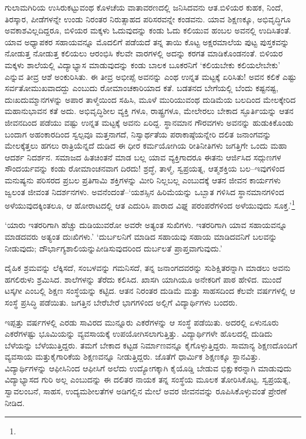 ಗುಲಾಮಗಿರಿಯ ಉಸಿರುಕಟ್ಟುವಂಥ ಕೊಳಚೆಯ ವಾತಾವರಣದಲ್ಲಿ ಜನಿಸಿದವನು ಆತ.\break ಬಿಳಿಯರ ಕುಹಕ, ನಿಂದೆ, ತಿರಸ್ಕಾರ, ಪೀಡೆಗಳನ್ನೇ ಉಂಡು ನಿರಂತರ ನಿರುತ್ಸಾಹದ ಪರಿಸರವನ್ನೇ ಕಂಡವನು. ಯಾವ ಶಿಕ್ಷಣಕ್ಕೂ, ಅಭಿವೃದ್ಧಿಗೂ ಅವಕಾಶವಿಲ್ಲದಿದ್ದರೂ, ಬಿಳಿಯರ ಮಕ್ಕಳು ಓದುವುದನ್ನು ಕಂಡು ಓದು ಕಲಿಯುವ ಹಂಬಲ ಅವನಲ್ಲಿ ಉದಿಸಿತಂತೆ. ಯಾವ ಅಧ್ಯಾಪಕರ ಸಹಾಯವನ್ನೂ ಮೊದಲಿಗೆ ಪಡೆಯದೆ ತನ್ನ ತಾಯಿ ಕೊಟ್ಟ ಅಕ್ಷರಮಾಲೆಯ ಪುಟ್ಟ ಪುಸ್ತಕವನ್ನು ನೋಡುತ್ತ ನೋಡುತ್ತ ಕಲಿಯಲು ಆರಂಭಿಸಿ ಕೆಲವೇ ವಾರಗಳಲ್ಲಿ ಅದನ್ನು ಕರಗತ ಮಾಡಿಕೊಂಡನಂತೆ. ಬಿಳಿಯರ ಮಕ್ಕಳು ಶಾಲೆಯಲ್ಲಿ ವಿದ್ಯಾಭ್ಯಾಸ ಮಾಡುವುದನ್ನು ಕಂಡು ಬಾಲಕ ಬೂಕರನಿಗೆ ‘ಕಲಿಯಬೇಕು ಕಲಿಯಲೇಬೇಕು’ ಎನ್ನುವ ತೀವ್ರ ಆಶೆ ಅಂಕುರಿಸಿತು. ಈ ತೀವ್ರ ಅಭೀಪ್ಸೆ ಅವನನ್ನು ಎಂಥ ಉನ್ನತ ಮಟ್ಟಕ್ಕೆ ಏರಿಸಿತು! ಅವನ ಕಲಿಕೆ ಎಷ್ಟು ಸರ್ವತೋಮುಖ\-ವಾದದ್ದು ಎಂಬುದು ರೋಮಾಂಚಕಾರಿಯಾದ ಕತೆ. ಬಡತನದ ಬೇಗೆಯಲ್ಲಿ ಬೆಂದು ಕಷ್ಟನಷ್ಟ, ದುಃಖ\-ದುಮ್ಮಾನಗಳನ್ನು ಅಪಾರ ತಾಳ್ಮೆಯಿಂದ ಸಹಿಸಿ, ಮೂಳೆ ಮುರಿಯುವಂಥ ದುಡಿಮೆಯ ಬಲದಿಂದ ಮೇಲಕ್ಕೇರಿದ ಮಹಾನುಭಾವನ ಕತೆ ಅದು. ಅಭಿವೃದ್ಧಿಶೀಲ ವ್ಯಕ್ತಿ ಗಳೂ, ರಾಷ್ಟ್ರಗಳೂ, ಮೇಲೇರಲು ಬೇಕಾದ ಸ್ಫೂರ್ತಿಯನ್ನು ಆತನ ಜೀವನದಿಂದ ಪಡೆಯು ವಷ್ಟು ಉನ್ನತ ಮಟ್ಟಕ್ಕೆ ಅವನು ಏರಿದ್ದ. ಸ್ಥಾನಮಾನ ಗೌರವಗಳು ಅವನನ್ನು ಹುಡುಕಿಕೊಂಡು ಬಂದಾಗ ಅಹಂಕಾರದಿಂದ ಸ್ವಲ್ಪವೂ ಮತ್ತನಾಗದೆ, ನಿಸ್ವಾರ್ಥತೆಯ ಪರಾಕಾಷ್ಠೆಯನ್ನೇರಿ ದಲಿತ ಜನಾಂಗವನ್ನು ಮೇಲಕ್ಕೆತ್ತಲು ಹಗಲು ರಾತ್ರಿಯೆನ್ನದೆ ದುಡಿದ ಈ ಧೀರ ಕರ್ಮಯೋಗಿಯ ರೀತಿನೀತಿಗಳು ಜಗತ್ತಿಗೇ ಒಂದು ಮಹಾ ಆದರ್ಶ ನಿದರ್ಶನ. ಸಮಾಜದ ಹಿತಚಿಂತನೆ ಮಾಡ ಬಲ್ಲ ಯಾವ ವ್ಯಕ್ತಿಗಾದರೂ ಈತನು ಆರ್ಜಿಸಿದ ಸದ್ಗುಣಗಳ ಸೌಂದರ್ಯವನ್ನು ಕಂಡು ರೋಮಾಂಚನವಾಗ ದಿರದು! ಶ್ರದ್ಧೆ, ತಾಳ್ಮೆ, ಸ್ವಪ್ರಯತ್ನ, ಆತ್ಮಶಕ್ತಿಯ ಬಲ–ಇವುಗಳಿಂದ ಮನುಷ್ಯನು ಪರಿಸರದ ಪ್ರಬಲ ಪ್ರತಿಗಾಮಿ ಶಕ್ತಿಗಳನ್ನು ಮೀರಿ ನಿಲ್ಲಬಲ್ಲ ಎಂಬುದಕ್ಕೆ ಆತನ ಜೀವನ ಕಾರ್ಯಗಳು ಜ್ವಲಂತ ಜೀವಂತ ನಿದರ್ಶನಗಳು. ಅವನೆಂದಂತೆ–‘ಯಶಸ್ಸಿನ ಹಿರಿಮೆಯನ್ನು ಒಬ್ಬಾತ ಗಳಿಸಿದ ಸ್ಥಾನಮಾನಗಳಿಂದ ಅಳೆಯುವುದಕ್ಕಿಂತಲೂ, ಆ ಹೋರಾಟದಲ್ಲಿ ಆತ ಎದುರಿಸಿ ಪಾರಾದ ವಿಘ್ನ ಪರಂಪರೆಗಳಿಂದ ಅಳೆಯುವುದು ಸೂಕ್ತ.’\footnote{\hfill{}}

‘ಯಾರು ಇತರರಿಗಾಗಿ ಹೆಚ್ಚು ದುಡಿಯುವರೋ ಅವರೇ ಅತ್ಯಂತ ಸುಖಿಗಳು. ಇತರರಿಗಾಗಿ ಯಾವ ಸಹಾಯವನ್ನೂ ಮಾಡದವರು ಅತ್ಯಂತ ದುಃಖಿಗಳು.’ ‘ದುರ್ಬಲನಿಗೆ ಮಾಡಿದ ಸಹಾಯವು ಸಹಾಯ ಮಾಡಿದವನಿಗೆ ಬಲವನ್ನು ನೀಡುವುದು; ದೌರ್ಭಾಗ್ಯಶಾಲಿಯನ್ನು\break ಪೀಡಿಸುವುದರಿಂದ ದುರ್ಬಲತೆ ಪ್ರಾಪ್ತವಾಗುವುದು.’

ದೈಹಿಕ ಶ್ರಮವನ್ನು ಲೆಕ್ಕಿಸದೆ, ಸಂಬಳವನ್ನು ಗಮನಿಸದೆ, ತನ್ನ ಜನಾಂಗದವರನ್ನು ಸುಶಿಕ್ಷಿತ\-ರನ್ನಾಗಿ ಮಾಡಲು ಅವನು ಹಗಲಿರುಳು ಶ್ರಮಿಸಿದ. ಶಾಲೆಗಳನ್ನು ತೆರೆದು ಕಲಿಸಿದ. ಖಾಸಗಿ ಯಾಗಿಯೂ ಅನೇಕರಿಗೆ ಪಾಠ ಹೇಳಿದ. ಮುಂದೆ ಟಸ್ಕಗೀ ಎಂಬಲ್ಲಿ ಶಿಕ್ಷಣ ಸಂಸ್ಥೆಯನ್ನು ಕಟ್ಟಿದ. ಆತನ ನಿರಂತರ ದುಡಿಮೆ ಮತ್ತು ಸಾಹಸದಿಂದ ಕೆಲವೇ ವರ್ಷಗಳಲ್ಲಿ ಆ ಸಂಸ್ಥೆ ಪ್ರಸಿದ್ಧಿ ಪಡೆಯಿತು. ಜಗತ್ತಿನ ಬೇರೆಬೇರೆ ಭಾಗಗಳಿಂದ ಅಲ್ಲಿಗೆ ವಿದ್ಯಾರ್ಥಿಗಳು ಬಂದರು.

ಇಪ್ಪತ್ತು ವರ್ಷಗಳಲ್ಲಿ ಎರಡು ಸಾವಿರದ ಮುನ್ನೂರು ಎಕರೆಗಳನ್ನು ಆ ಸಂಸ್ಥೆ ಪಡೆಯಿತು. ಅದರಲ್ಲಿ ಏಳುನೂರು ಎಕರೆಗಳಷ್ಟು ಭೂಮಿಯನ್ನು ವ್ಯವಸಾಯಕ್ಕೆ ಉಪಯೋಗಿಸಲಾಗುತ್ತಿತ್ತು. ವಿದ್ಯಾರ್ಥಿಗಳೇ ಹೊಲದಲ್ಲಿ ದುಡಿದು ಬೆಳೆಯನ್ನು ಬೆಳೆಯುತ್ತಿದ್ದರು. ತಮಗೆ ಬೇಕಾದ ಕಟ್ಟಡ ನಿರ್ಮಾಣವನ್ನೂ ಕೈಗೊಳ್ಳುತ್ತಿದ್ದರು. ಸಾಮಾನ್ಯ ಶಿಕ್ಷಣದೊಂದಿಗೆ ವ್ಯವಸಾಯ ಮತ್ತು\break ಕೈಗಾರಿಕೆಯ ಶಿಕ್ಷಣವನ್ನೂ ನೀಡುತ್ತಿದ್ದರು. ಜೊತೆಗೆ ಧಾರ್ಮಿಕ ಶಿಕ್ಷಣಕ್ಕೂ ಸ್ಥಾನವಿತ್ತು. ವಿದ್ಯಾರ್ಥಿಗಳನ್ನು ಆಫೀಸಿನಿಂದ ಆಫೀಸಿಗೆ ಅಲೆದು ಉದ್ಯೋಗಕ್ಕಾಗಿ ಕೈಯೊಡ್ಡಿ ಬೇಡುವ ಭಿಕ್ಷುಕರನ್ನಾಗಿ ಮಾಡುವುದು ವಿದ್ಯಾಭ್ಯಾಸದ ಗುರಿ ಅಲ್ಲ ಎಂಬುದನ್ನು ಈ ದಲಿತರ ನಾಯಕ ತನ್ನ ಸಂಸ್ಥೆಯ ಮೂಲಕ ತೋರಿಸಿಕೊಟ್ಟ. ಸ್ವಪ್ರಯತ್ನ, ಸ್ವಾವಲಂಬನೆ, ಸಾಹಸ, ಉದ್ಯಮಶೀಲತೆಗಳ ಅಡಿಗಲ್ಲಿನ ಮೇಲೆ ಅವರ ಜೀವನವನ್ನು ರೂಪಿಸಿಕೊಳ್ಳುವಂತೆ ಪ್ರೇರಣೆ ನೀಡಿದ.

